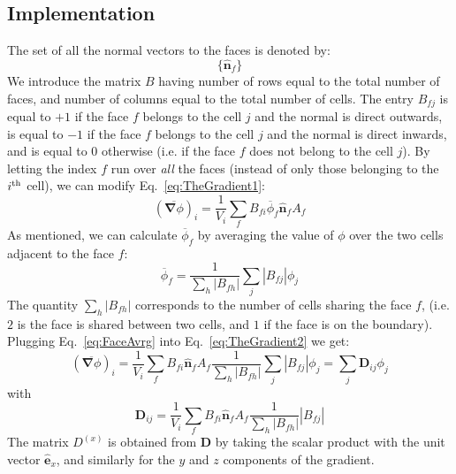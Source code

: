 \documentclass[]{article}
\newcommand{\bs}[1]{\boldsymbol{#1}}
\newcommand{\Eq}[1]{\begin{equation}#1\end{equation}}
\begin{document}
\subsection*{Implementation}
The set of all the normal vectors to the faces is denoted by:
\Eq{\{ \hat{\bs{n}}_f\}  }
We introduce the matrix $B$ having number of rows equal to the total number of faces, and number of columns equal to the total number of cells. The entry $B_{f j}$ is equal to $+1$ if the face $f$ belongs to the cell $j$ and the normal is direct outwards, is equal to  $-1$ if the face $f$ belongs to the cell $j$ and the normal is direct inwards,  and is equal to $0$ otherwise (i.e. if the face $f$ does not belong to the cell $j$).
By letting the index $f$ run over \emph{all} the faces (instead of only those belonging to the $i^{\text{\scriptsize th}}$ cell), we can modify Eq.~\ref{eq:TheGradient1}:
 \Eq{(\overline{ \bs{\nabla}\phi})_i =  \frac{1}{V_i} \sum_f B_{fi}  \overline{\phi}_f  \hat{\bs{n}}_f A_f \label{eq:TheGradient2}}
As mentioned, we can calculate  $\overline{\phi}_f $ by averaging the value of $\phi$ over the two cells adjacent to the face $f$:
\Eq{ \overline{\phi}_f  = \frac{1}{\sum_h |B_{fh}|}\sum_j |B_{fj}| \phi_j \label{eq:FaceAvrg}}
The quantity $\sum_h |B_{fh}|$ corresponds to the number of cells sharing the face $f$, (i.e. $2$ is the face is shared between two cells, and $1$ if the face is on the boundary).
Plugging Eq.~\ref{eq:FaceAvrg} into Eq.~\ref{eq:TheGradient2} we get:
 \Eq{(\overline{ \bs{\nabla}\phi})_i =  \frac{1}{V_i} \sum_f B_{fi} \hat{\bs{n}}_f A_f  \frac{1}{\sum_h |B_{fh}|}\sum_j |B_{fj}| \phi_j  = \sum_j \bs{D}_{ij}\phi_j }
with
 \Eq{  \bs{D}_{ij}  =  \frac{1}{V_i} \sum_f B_{fi} \hat{\bs{n}}_f A_f  \frac{1}{\sum_h |B_{fh}|}| B_{fj} |}
The matrix $D^{(x)}$ is obtained from $ \bs{D}$ by taking the scalar product with the unit vector $\hat{\bs{e}}_x$, and similarly for the $y$ and $z$ components of the gradient.
\end{document}
